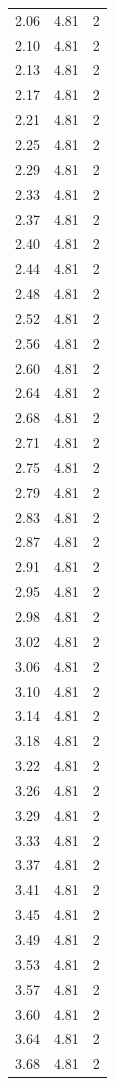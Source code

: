 \begin{longtable}{lrr}
  2.06 & 4.81 & 2 \\
  2.10 & 4.81 & 2 \\
  2.13 & 4.81 & 2 \\
  2.17 & 4.81 & 2 \\
  2.21 & 4.81 & 2 \\
  2.25 & 4.81 & 2 \\
  2.29 & 4.81 & 2 \\
  2.33 & 4.81 & 2 \\
  2.37 & 4.81 & 2 \\
  2.40 & 4.81 & 2 \\
  2.44 & 4.81 & 2 \\
  2.48 & 4.81 & 2 \\
  2.52 & 4.81 & 2 \\
  2.56 & 4.81 & 2 \\
  2.60 & 4.81 & 2 \\
  2.64 & 4.81 & 2 \\
  2.68 & 4.81 & 2 \\
  2.71 & 4.81 & 2 \\
  2.75 & 4.81 & 2 \\
  2.79 & 4.81 & 2 \\
  2.83 & 4.81 & 2 \\
  2.87 & 4.81 & 2 \\
  2.91 & 4.81 & 2 \\
  2.95 & 4.81 & 2 \\
  2.98 & 4.81 & 2 \\
  3.02 & 4.81 & 2 \\
  3.06 & 4.81 & 2 \\
  3.10 & 4.81 & 2 \\
  3.14 & 4.81 & 2 \\
  3.18 & 4.81 & 2 \\
  3.22 & 4.81 & 2 \\
  3.26 & 4.81 & 2 \\
  3.29 & 4.81 & 2 \\
  3.33 & 4.81 & 2 \\
  3.37 & 4.81 & 2 \\
  3.41 & 4.81 & 2 \\
  3.45 & 4.81 & 2 \\
  3.49 & 4.81 & 2 \\
  3.53 & 4.81 & 2 \\
  3.57 & 4.81 & 2 \\
  3.60 & 4.81 & 2 \\
  3.64 & 4.81 & 2 \\
  3.68 & 4.81 & 2 \\

\end{longtable}
